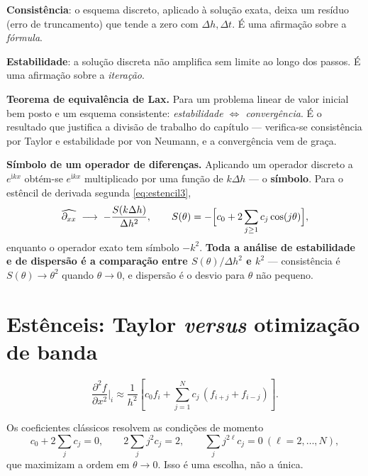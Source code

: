 \documentclass[11pt,a4paper,oneside]{report}
\begin{document}
\begin{matematica}
\textbf{Consist\^encia}: o esquema discreto, aplicado \`a solu\c{c}\~ao exata,
deixa um res\'iduo (erro de truncamento) que tende a zero com
$\Delta h,\Delta t$. \'E uma afirma\c{c}\~ao sobre a \emph{f\'ormula}.

\textbf{Estabilidade}: a solu\c{c}\~ao discreta n\~ao amplifica sem limite ao
longo dos passos. \'E uma afirma\c{c}\~ao sobre a \emph{itera\c{c}\~ao}.

\textbf{Teorema de equival\^encia de Lax.} Para um problema linear de valor
inicial bem posto e um esquema consistente: \emph{estabilidade $\Leftrightarrow$
converg\^encia}. \'E o resultado que justifica a divis\~ao de trabalho do
cap\'itulo --- verifica-se consist\^encia por Taylor e estabilidade por von
Neumann, e a converg\^encia vem de gra\c{c}a.

\textbf{S\'imbolo de um operador de diferen\c{c}as.} Aplicando um operador
discreto a $e^{\mathrm{i}kx}$ obt\'em-se $e^{\mathrm{i}kx}$ multiplicado por
uma fun\c{c}\~ao de $k\Delta h$ --- o \textbf{s\'imbolo}. Para o est\^encil de
derivada segunda \eqref{eq:estencil3},
\[
\widehat{\partial_{xx}}
 \;\longrightarrow\;
 -\frac{S(k\Delta h)}{\Delta h^{2}},
\qquad
S(\theta) = -\Bigl[c_0 + 2\sum_{j\ge1} c_j\cos(j\theta)\Bigr],
\]
enquanto o operador exato tem s\'imbolo $-k^{2}$. \textbf{Toda a an\'alise de
estabilidade e de dispers\~ao \'e a compara\c{c}\~ao entre $S(\theta)/\Delta
h^{2}$ e $k^{2}$} --- consist\^encia \'e $S(\theta)\to\theta^{2}$ quando
$\theta\to 0$, e dispers\~ao \'e o desvio para $\theta$ n\~ao pequeno.
\end{matematica}

\section{Est\^enceis: Taylor \emph{versus} otimiza\c{c}\~ao de banda}

\begin{equation}
\frac{\partial^{2} f}{\partial x^{2}}\bigg|_{i} \approx
\frac{1}{h^{2}}\left[c_0 f_i + \sum_{j=1}^{N} c_j\,(f_{i+j} + f_{i-j})\right].
\label{eq:estencil3}
\end{equation}

Os coeficientes cl\'assicos resolvem as condi\c{c}\~oes de momento
\[
c_0 + 2\sum_j c_j = 0, \qquad 2\sum_j j^{2}c_j = 2,
\qquad \sum_j j^{2\ell}c_j = 0\ (\ell=2,\dots,N),
\]
que maximizam a ordem em $\theta \to 0$. Isso \'e uma escolha, n\~ao a
\'unica.
\end{document}
